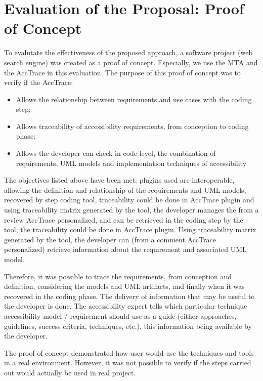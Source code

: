 \documentclass[10pt, conference, compsocconf]{IEEEtran}
\begin{document}
\section{Evaluation of the Proposal: Proof of Concept} 

To evalutate the effectiveness of the proposed approach, a software project (web search engine) was created as a proof of concept. Especially, we use the MTA and the AccTrace in this evaluation. The purpose of this proof of concept was to verify if the AccTrace:

\begin{itemize}
  \item Allows the relationship between requirements and use cases with the coding step;
  \item Allows traceability of accessibility requirements, from conception to coding phase;   
  \item Allows the developer can check in code level, the combination of requirements, UML models and implementation techniques of accessibility
\end{itemize}

The objectives listed above have been met:
plugins used are interoperable, allowing the definition and relationship of the requirements and UML models, recovered by step coding tool, traceability could be done in AccTrace plugin and using traceability matrix generated by the tool, the developer manages the from a review AccTrace personalized, and can be retrieved in the coding step by the tool, the traceability could be done in AccTrace plugin. Using traceability matrix generated by the tool, the developer can (from a comment AccTrace personalized) retrieve information about the requirement and associated UML model.

Therefore, it was possible to trace the requirements, from conception and definition, considering the models and UML artifacts,
and finally when it was recovered in the coding phase. The delivery of information that may be useful to the developer is done.
The accessibility expert tells which particular technique accessibility
model / requirement should use as a guide (either approaches, guidelines, success criteria,
techniques, etc.), this information being available by the developer.

The proof of concept demonstrated how user would use the
techniques and tools in a real environment. However, it was not possible to verify
if the steps carried out would actually be used in real project.
\end{document}
